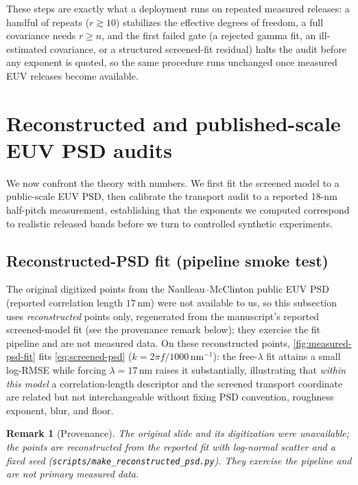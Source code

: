 \documentclass[11pt]{article}
\newtheorem{remark}{Remark}
\begin{document}
These steps are exactly what a deployment runs on repeated measured releases: a handful of repeats (\(r\gtrsim10\)) stabilizes the effective degrees of freedom, a full covariance needs \(r\ge n\), and the first failed gate (a rejected gamma fit, an ill-estimated covariance, or a structured screened-fit residual) halts the audit before any exponent is quoted, so the same procedure runs unchanged once measured EUV releases become available.

\section{Reconstructed and published-scale EUV PSD audits}
\label{sec:audits}

We now confront the theory with numbers. We first fit the screened model to a public-scale EUV PSD, then calibrate the transport audit to a reported 18-nm half-pitch measurement, establishing that the exponents we computed correspond to realistic released bands before we turn to controlled synthetic experiments.

\subsection{Reconstructed-PSD fit (pipeline smoke test)}

The original digitized points from the Naulleau--McClinton public EUV PSD (reported correlation length \(17\,\mathrm{nm}\)) \cite{naulleau2011metrology} were not available to us, so this subsection uses \emph{reconstructed} points only, regenerated from the manuscript's reported screened-model fit (see the provenance remark below); they exercise the fit pipeline and are not measured data. On these reconstructed points, \cref{fig:measured-psd-fit} fits \eqref{eq:screened-psd} (\(k=2\pi f/1000\,\mathrm{nm}^{-1}\)): the free-\(\lambda\) fit attains a small log-RMSE while forcing \(\lambda=17\,\mathrm{nm}\) raises it substantially, illustrating that \emph{within this model} a correlation-length descriptor and the screened transport coordinate are related but not interchangeable without fixing PSD convention, roughness exponent, blur, and floor.

\begin{remark}[Provenance]
The original slide and its digitization were unavailable; the points are \emph{reconstructed} from the reported fit with log-normal scatter and a fixed seed (\texttt{scripts/make\_reconstructed\_psd.py}). They exercise the pipeline and are not primary measured data.
\end{remark}
\end{document}
